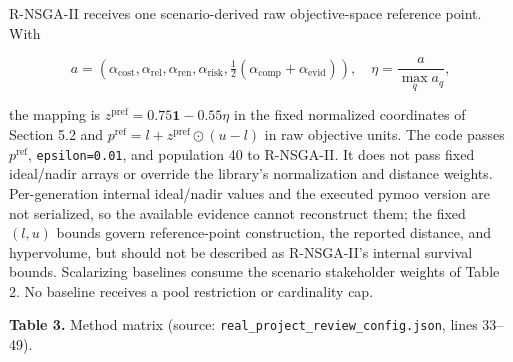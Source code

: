 \documentclass[
  10pt,
  a4paper,
]{article}
\begin{document}
R-NSGA-II receives one scenario-derived raw objective-space reference
point. With

\[
a=(\alpha_{\mathrm{cost}},\alpha_{\mathrm{rel}},\alpha_{\mathrm{ren}},
\alpha_{\mathrm{risk}},\tfrac12(\alpha_{\mathrm{comp}}+\alpha_{\mathrm{evid}})),
\quad \eta=\frac{a}{\max_q a_q},
\]

the mapping is \(z^{\mathrm{pref}}=0.75\mathbf1-0.55\eta\) in the fixed
normalized coordinates of Section 5.2 and
\(p^{\mathrm{ref}}=l+z^{\mathrm{pref}}\odot(u-l)\) in raw objective
units. The code passes \(p^{\mathrm{ref}}\), \texttt{epsilon=0.01}, and
population 40 to R-NSGA-II. It does not pass fixed ideal/nadir arrays or
override the library's normalization and distance weights.
Per-generation internal ideal/nadir values and the executed pymoo
version are not serialized, so the available evidence cannot reconstruct
them; the fixed \((l,u)\) bounds govern reference-point construction,
the reported distance, and hypervolume, but should not be described as
R-NSGA-II's internal survival bounds. Scalarizing baselines consume the
scenario stakeholder weights of Table 2. No baseline receives a pool
restriction or cardinality cap.

\textbf{Table 3.} Method matrix (source:
\texttt{real\_project\_review\_config.json}, lines 33--49).
\end{document}

